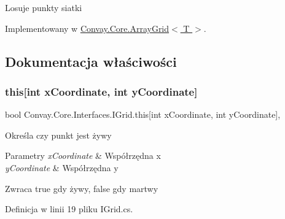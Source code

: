 Losuje punkty siatki 



Implementowany w \hyperlink{class_convay_1_1_core_1_1_array_grid_a0a40a1e8519368ecfcb1e1467a53e513}{Convay.\+Core.\+Array\+Grid$<$ T $>$}.



\subsection{Dokumentacja właściwości}
\hypertarget{interface_convay_1_1_core_1_1_interfaces_1_1_i_grid_ae1562a81e75321521382918483706e65}{}\label{interface_convay_1_1_core_1_1_interfaces_1_1_i_grid_ae1562a81e75321521382918483706e65} 
\subsubsection{\texorpdfstring{this[int x\+Coordinate, int y\+Coordinate]}{this[int xCoordinate, int yCoordinate]}}
{\footnotesize\ttfamily bool Convay.\+Core.\+Interfaces.\+I\+Grid.\+this\mbox{[}int x\+Coordinate, int y\+Coordinate\mbox{]}\hspace{0.3cm}{\ttfamily [get]}, {\ttfamily [set]}}



Określa czy punkt jest żywy 


\begin{DoxyParams}{Parametry}
{\em x\+Coordinate} & Współrzędna x\\
\hline
{\em y\+Coordinate} & Współrzędna y\\
\hline
\end{DoxyParams}
\begin{DoxyReturn}{Zwraca}
true gdy żywy, false gdy martwy
\end{DoxyReturn}


Definicja w linii 19 pliku I\+Grid.\+cs.

\hypertarget{interface_convay_1_1_core_1_1_interfaces_1_1_i_grid_a1e8b553ad4216cc871e5ba22518cafdb}{}\label{interface_convay_1_1_core_1_1_interfaces_1_1_i_grid_a1e8b553ad4216cc871e5ba22518cafdb} 
